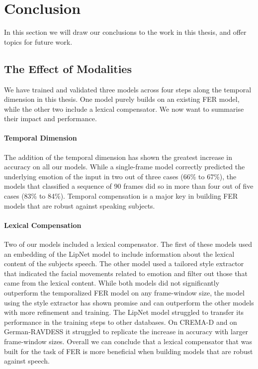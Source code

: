 \newpage
\section{Conclusion}
\label{sec:conclusion}
In this section we will draw our conclusions to the work in this thesis, and offer topics for future work.

\subsection{The Effect of Modalities}
We have trained and validated three models across four steps along the temporal dimension in this thesis. One model purely builds on an existing FER model, while the other two include a lexical compensator. We now want to summarise their impact and performance.

\paragraph{Temporal Dimension}
The addition of the temporal dimension has shown the greatest increase in accuracy on all our models. While a single-frame model correctly predicted the underlying emotion of the input in two out of three cases (66\% to 67\%), the models that classified a sequence of 90 frames did so in more than four out of five cases (83\% to 84\%). Temporal compensation is a major key in building FER models that are robust against speaking subjects.

\paragraph{Lexical Compensation}
Two of our models included a lexical compensator. The first of these models used an embedding of the LipNet model to include information about the lexical content of the subjects speech. The other model used a tailored style extractor that indicated the facial movements related to emotion and filter out those that came from the lexical content. While both models did not significantly outperform the temporalized FER model on any frame-window size, the model using the style extractor has shown promise and can outperform the other models with more refinement and training. The LipNet model struggled to transfer its performance in the training steps to other databases. On CREMA-D and on German-RAVDESS it struggled to replicate the increase in accuracy with larger frame-window sizes. Overall we can conclude that a lexical compensator that was built for the task of FER is more beneficial when building models that are robust against speech.

